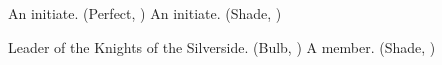 \documentclass[blue]{Silversiders}
\begin{document}
\begin{members}
	\member{\cTruth{}} An initiate. (Perfect, \cTruth{\Sex})
	\member{\cWisdom{}} An initiate. (Shade, \cWisdom{\Sex})
	
\end{members}

\begin{members}
	\member{\cHonor{}} Leader of the Knights of the Silverside. (Bulb, \cHonor{\Sex})
	\member{\cTraitor{}} A member. (Shade, \cTraitor{\Sex})
	
\end{members}
\end{document}
